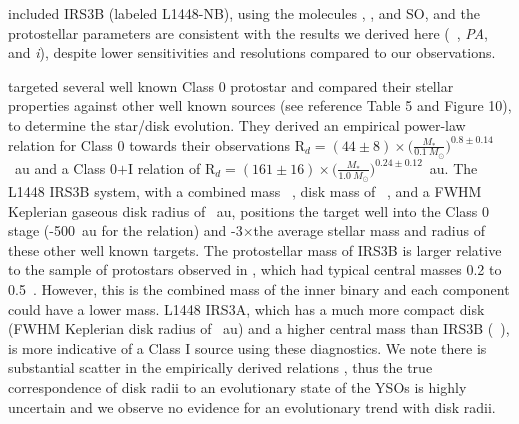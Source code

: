 \citet{2020AA...635A..15M}\space included IRS3B (labeled L1448-NB), using the molecules \tco, \ceo, and SO, and the protostellar parameters are consistent with the results we derived here (\mstar{}~\msun, \textit{PA}\deg, and \textit{i}\deg), despite lower sensitivities and resolutions compared to our observations.

\citet[][]{2017ApJ...834..178Y} targeted several well known Class 0 protostar and compared their stellar properties against other well known sources (see reference Table 5 and Figure 10), to determine the star/disk evolution. They derived an empirical power-law relation for Class 0 towards their observations R$_{d}=(44\pm8)\times\big(\frac{M_{*}}{0.1~M_{\odot}}\big)^{0.8\pm0.14}$~au and a Class 0$+$I relation of R$_{d}=(161\pm16)\times\big(\frac{M_{*}}{1.0~M_{\odot}}\big)^{0.24\pm0.12}$~au. The L1448 IRS3B system, with a combined mass ~\solm, disk mass of ~\solm, and a FWHM Keplerian gaseous disk radius of ~au, positions the target well into the Class 0 stage (-500~au for the \citet[][]{2017ApJ...834..178Y} relation) and -3$\times$\space the average stellar mass and radius of these other well known targets. The protostellar mass of IRS3B is larger relative to the sample of protostars observed in \citet[][]{2017ApJ...834..178Y}, which had typical central masses 0.2 to 0.5~\solm. However, this is the combined mass of the inner binary and each component could have a lower mass. L1448 IRS3A, which has a much more compact disk (FWHM Keplerian disk radius of ~au) and a higher central mass than IRS3B (~\solm), is more indicative of a Class I source using these diagnostics. We note there is substantial scatter in the empirically derived relations \citep{2020ApJ...890..130T}, thus the true correspondence of disk radii to an evolutionary state of the YSOs is highly uncertain and we observe no evidence for an evolutionary trend with disk radii.



